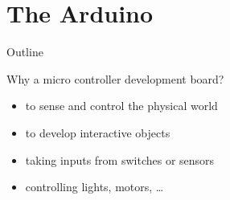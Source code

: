 \section {The Arduino}
\begin{frame} {Outline}
    \tableofcontents [current]
\end{frame}

\begin{frame} {Why a micro controller development board?}
    \begin{itemize}
		\item to sense and control the physical world
		\item to develop interactive objects
		\item taking inputs from switches or sensors
		\item controlling lights, motors, …
    \end{itemize}
\end{frame}



